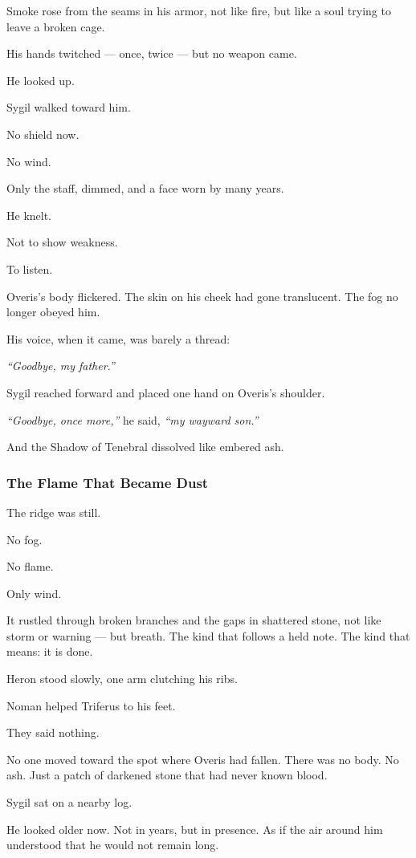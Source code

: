 \documentclass[12pt]{article}
\begin{document}
Smoke rose from the seams in his armor, not like fire, but like a soul trying to leave a broken cage.

His hands twitched — once, twice — but no weapon came.

He looked up.

Sygil walked toward him.

No shield now.

No wind.

Only the staff, dimmed, and a face worn by many years.

He knelt.

Not to show weakness.

To listen.

Overis’s body flickered. The skin on his cheek had gone translucent. The fog no longer obeyed him.

His voice, when it came, was barely a thread:

\textit{“Goodbye, my father.”}

\bigskip

Sygil reached forward and placed one hand on Overis’s shoulder.

\textit{“Goodbye, once more,”} he said, \textit{“my wayward son.”}

And the Shadow of Tenebral dissolved like embered ash.

\dotfill

\subsubsection{The Flame That Became Dust}
The ridge was still.

No fog.

No flame.

Only wind.

It rustled through broken branches and the gaps in shattered stone, not like storm or warning — but breath. The kind that follows a held note. The kind that means: it is done.

Heron stood slowly, one arm clutching his ribs.

Noman helped Triferus to his feet.

They said nothing.

No one moved toward the spot where Overis had fallen. There was no body. No ash. Just a patch of darkened stone that had never known blood.

Sygil sat on a nearby log.

He looked older now. Not in years, but in presence. As if the air around him understood that he would not remain long.
\end{document}

